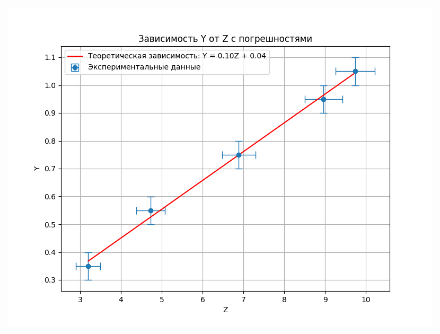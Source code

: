 \documentclass[a4paper]{article}
\begin{document}
\begin{figure}[H]
\begin{center}
\includegraphics[scale=0.5]{Graph_1.png}
\end{center}
\end{figure}
\end{document}
